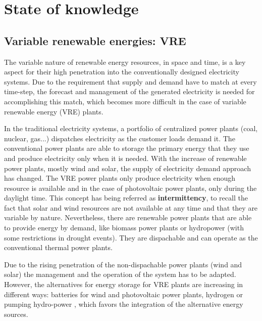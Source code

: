  
\chapter{State of knowledge\label{cha:state}}


\section{Variable renewable energies: VRE}

The variable nature of renewable energy resources, in space and time, is a key aspect for their high penetration into the conventionally designed electricity systems. Due to the requirement that supply and demand have to match at every time-step, the forecast and management of the generated electricity is needed for accomplishing this match, which becomes more difficult in the case of variable renewable energy (VRE) plants.

In the traditional electricity systems, a portfolio of centralized power plants (coal, nuclear, gas...) dispatches electricity as the customer loads demand it. The conventional power plants are able to storage the primary energy that they use and produce electricity only when it is needed. With the increase of renewable power plants, mostly wind and solar, the supply of electricity demand approach has changed. The VRE power plants only produce electricity when enough resource is available and in the case of photovoltaic power plants, only during the daylight time. This concept has being referred as \textbf{intermittency}, to recall the fact that solar and wind resources are not available at any time and that they are variable by nature. Nevertheless, there are renewable power plants that are able to provide energy by demand, like biomass power plants or hydropower (with some restrictions in drought events). They are dispachable and can operate as the conventional thermal power plants.

Due to the rising penetration of the non-dispachable power plants (wind and solar) the management  and the operation of the system has to be adapted. However, the alternatives for energy storage for VRE plants are increasing in different ways: batteries for wind and photovoltaic power plants, hydrogen or pumping hydro-power \cite*{Lund2015, Blanco2018, Schaber2004}, which favors the integration of the alternative energy sources.

